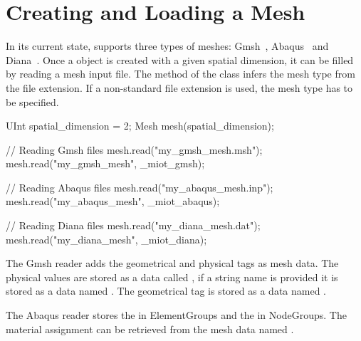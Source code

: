 \section{Creating and Loading a Mesh\label{sect:common:mesh}}

In its current state, \akantu supports three types of meshes: Gmsh~\cite{gmsh},
Abaqus~\cite{abaqus} and Diana~\cite{diana}. Once a  object is
created with a given spatial dimension, it can be filled by reading a mesh input file.
The method  of the class  infers the mesh type from the file extension. If a non-standard file extension is used, the mesh type has to be specified.

\begin{cpp}
UInt spatial_dimension = 2;
Mesh mesh(spatial_dimension);

// Reading Gmsh files
mesh.read("my_gmsh_mesh.msh");
mesh.read("my_gmsh_mesh", _miot_gmsh);


// Reading Abaqus files
mesh.read("my_abaqus_mesh.inp");
mesh.read("my_abaqus_mesh", _miot_abaqus);

// Reading Diana files
mesh.read("my_diana_mesh.dat");
mesh.read("my_diana_mesh", _miot_diana);
\end{cpp}

The Gmsh reader adds the geometrical and physical tags as mesh data. The physical
values are stored as a  data called , if a string
name is provided it is stored as a  data named
. The geometrical tag is stored as a  data named
.


The Abaqus reader stores the  in ElementGroups and the 
in NodeGroups. The material assignment can be retrieved from the
 mesh data named .


